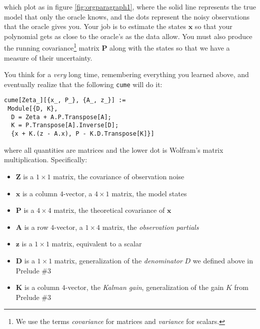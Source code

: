 \documentclass[10pt,oneside,x11names]{article}
\begin{document}
\noindent which plot as in figure \ref{fig:orgparagraph1}, where the solid line
represents the true model that only the oracle knows, and the dots represent the
noisy observations that the oracle gives you. Your job is to estimate the states
\(\mathbold{x}\) so that your polynomial gets as close to the oracle's as the
data allow. You must also produce the running covariance\footnote{We use the
  terms \emph{covariance} for matrices and \emph{variance} for scalars.} matrix
\(\mathbold{P}\) along with the states so that we have a measure of their
uncertainty.

You think for a \emph{very} long time, remembering everything you learned above, and
eventually realize that the following \texttt{cume} will do it:

\begin{verbatim}
cume[Zeta_][{x_, P_}, {A_, z_}] :=
 Module[{D, K},
  D = Zeta + A.P.Transpose[A];
  K = P.Transpose[A].Inverse[D];
  {x + K.(z - A.x), P - K.D.Transpose[K]}]
\end{verbatim}

\noindent where all quantities are matrices and the lower dot is Wolfram's matrix
multiplication.  Specifically:

\begin{itemize}
\item \(\mathbold{Z}\) is a \(1\times{1}\) matrix, the covariance of
observation noise
\item \(\mathbold{x}\) is a column \(4\)-vector, a \(4\times{1}\) matrix, the
  model states
\item \(\mathbold{P}\) is a \(4\times{4}\) matrix, the theoretical
covariance of \(\mathbold{x}\)
\item \(\mathbold{A}\) is a row \(4\)-vector, a \(1\times{4}\) matrix, the
  \emph{observation partials}
\item \(\mathbold{z}\) is a \({1}\times{1}\) matrix, equivalent to  a scalar
\item \(\mathbold{D}\) is a \({1}\times{1}\) matrix, generalization of the
\emph{denominator} \(D\) we defined above in Prelude \#3
\item \(\mathbold{K}\) is a column \(4\)-vector, the \emph{Kalman gain}, generalization of the
gain \(K\) from Prelude \#3
\end{itemize}
\end{document}
